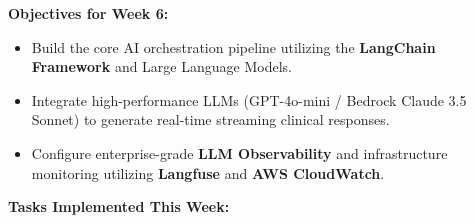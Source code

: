 \vspace{0.5em}\noindent\textbf{Objectives for Week 6:}

\begin{itemize}
\tightlist
\item
  Build the core AI orchestration pipeline utilizing the
  \textbf{LangChain Framework} and Large Language Models.
\item
  Integrate high-performance LLMs (GPT-4o-mini / Bedrock Claude 3.5
  Sonnet) to generate real-time streaming clinical responses.
\item
  Configure enterprise-grade \textbf{LLM Observability} and
  infrastructure monitoring utilizing \textbf{Langfuse} and \textbf{AWS
  CloudWatch}.
\end{itemize}

\vspace{0.5em}\noindent\textbf{Tasks Implemented This Week:}

